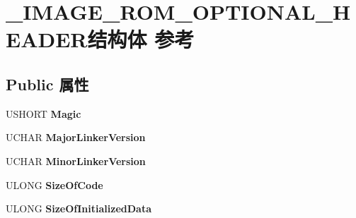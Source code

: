 \hypertarget{struct___i_m_a_g_e___r_o_m___o_p_t_i_o_n_a_l___h_e_a_d_e_r}{}\section{\+\_\+\+I\+M\+A\+G\+E\+\_\+\+R\+O\+M\+\_\+\+O\+P\+T\+I\+O\+N\+A\+L\+\_\+\+H\+E\+A\+D\+E\+R结构体 参考}
\label{struct___i_m_a_g_e___r_o_m___o_p_t_i_o_n_a_l___h_e_a_d_e_r}
\subsection*{Public 属性}
\begin{DoxyCompactItemize}
\item 
\mbox{\label{struct___i_m_a_g_e___r_o_m___o_p_t_i_o_n_a_l___h_e_a_d_e_r_a2a67cb6271603a774ecf5085e7b1ff7a}} 
U\+S\+H\+O\+RT {\bfseries Magic}
\item 
\mbox{\label{struct___i_m_a_g_e___r_o_m___o_p_t_i_o_n_a_l___h_e_a_d_e_r_a12e5b75edd72d5d38921c908ea07efa8}} 
U\+C\+H\+AR {\bfseries Major\+Linker\+Version}
\item 
\mbox{\label{struct___i_m_a_g_e___r_o_m___o_p_t_i_o_n_a_l___h_e_a_d_e_r_a41dd137cbc858dc057ad081e96c8b30f}} 
U\+C\+H\+AR {\bfseries Minor\+Linker\+Version}
\item 
\mbox{\label{struct___i_m_a_g_e___r_o_m___o_p_t_i_o_n_a_l___h_e_a_d_e_r_a8b14c95c58d1267f6fdb3578cb8d87aa}} 
U\+L\+O\+NG {\bfseries Size\+Of\+Code}
\item 
\mbox{\label{struct___i_m_a_g_e___r_o_m___o_p_t_i_o_n_a_l___h_e_a_d_e_r_a89e637f1207849fa5f6f13971d2f8164}} 
U\+L\+O\+NG {\bfseries Size\+Of\+Initialized\+Data}
\item 
\mbox{\label{struct___i_m_a_g_e___r_o_m___o_p_t_i_o_n_a_l___h_e_a_d_e_r_a472020d4b723cbfc41d25f5f5c641c83}} 

\end{DoxyCompactItemize}
